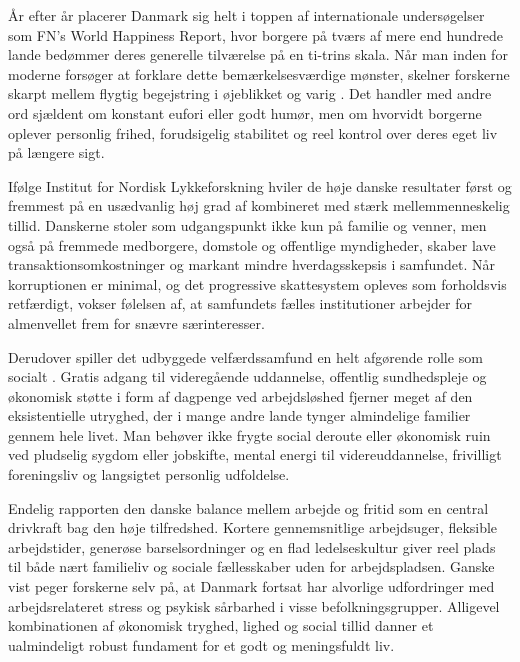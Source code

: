 År efter år placerer Danmark sig helt i toppen af internationale undersøgelser som FN's World Happiness Report, hvor borgere på tværs af mere end hundrede lande bedømmer deres generelle tilværelse på en ti-trins skala. Når man inden for moderne  forsøger at forklare dette bemærkelsesværdige mønster, skelner forskerne skarpt mellem flygtig begejstring i øjeblikket og varig . Det handler med andre ord sjældent om konstant eufori eller godt humør, men om hvorvidt borgerne oplever personlig frihed, forudsigelig stabilitet og reel kontrol over deres eget liv på længere sigt.

Ifølge Institut for Nordisk Lykkeforskning hviler de høje danske resultater først og fremmest på en usædvanlig høj grad af  kombineret med stærk mellemmenneskelig tillid. Danskerne stoler som udgangspunkt ikke kun på familie og venner, men også på fremmede medborgere, domstole og offentlige myndigheder,  skaber lave transaktionsomkostninger og markant mindre hverdagsskepsis i samfundet. Når korruptionen er minimal, og det progressive skattesystem opleves som forholdsvis retfærdigt, vokser følelsen af, at samfundets fælles institutioner arbejder for almenvellet frem for snævre særinteresser.

Derudover spiller det udbyggede velfærdssamfund en helt afgørende rolle som socialt . Gratis adgang til videregående uddannelse, offentlig sundhedspleje og økonomisk støtte i form af dagpenge ved arbejdsløshed fjerner meget af den eksistentielle utryghed, der i mange andre lande tynger almindelige familier gennem hele livet. Man behøver ikke frygte social deroute eller økonomisk ruin ved pludselig sygdom eller jobskifte,  mental energi til videreuddannelse, frivilligt foreningsliv og langsigtet personlig udfoldelse.

Endelig  rapporten den danske balance mellem arbejde og fritid som en central drivkraft bag den høje tilfredshed. Kortere gennemsnitlige arbejdsuger, fleksible arbejdstider, generøse barselsordninger og en flad ledelseskultur giver reel plads til både nært familieliv og sociale fællesskaber uden for arbejdspladsen. Ganske vist peger forskerne selv på, at Danmark fortsat har alvorlige udfordringer med arbejdsrelateret stress og psykisk sårbarhed i visse befolkningsgrupper. Alligevel  kombinationen af økonomisk tryghed, lighed og social tillid danner et ualmindeligt robust fundament for et godt og meningsfuldt liv.

